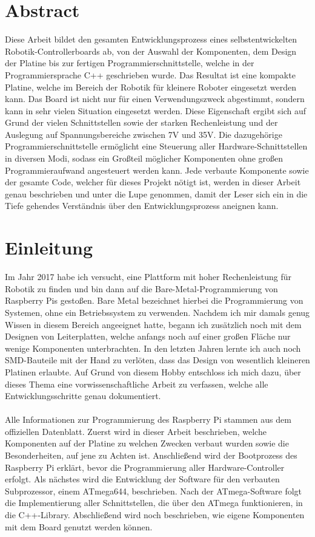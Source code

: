\documentclass[12pt]{article}
\begin{document}
\newpage\section*{Abstract}
Diese Arbeit bildet den gesamten Entwicklungsprozess eines selbstentwickelten Robotik-Controllerboards ab, von der Auswahl der Komponenten, dem Design der Platine bis zur fertigen Programmierschnittstelle, welche in der Programmiersprache C++ geschrieben wurde. Das Resultat ist eine kompakte Platine, welche im Bereich der Robotik für kleinere Roboter eingesetzt werden kann. Das Board ist nicht nur für einen Verwendungszweck abgestimmt, sondern kann in sehr vielen Situation eingesetzt werden. Diese Eigenschaft ergibt sich auf Grund der vielen Schnittstellen sowie der starken Rechenleistung und der Auslegung auf Spannungsbereiche zwischen 7V und 35V. Die dazugehörige Programmierschnittstelle ermöglicht eine Steuerung aller Hardware-Schnittstellen in diversen Modi, sodass ein Großteil möglicher Komponenten ohne großen Programmieraufwand angesteuert werden kann. Jede verbaute Komponente sowie der gesamte Code, welcher für dieses Projekt nötigt ist, werden in dieser Arbeit genau beschrieben und unter die Lupe genommen, damit der Leser sich ein in die Tiefe gehendes Verständnis über den Entwicklungsprozess aneignen kann.
\newpage\tableofcontents
\newpage\section{Einleitung}
Im Jahr 2017 habe ich versucht, eine Plattform mit hoher Rechenleistung für Robotik zu finden und bin dann auf die Bare-Metal-Programmierung von Raspberry Pis gestoßen. Bare Metal bezeichnet hierbei die Programmierung von Systemen, ohne ein Betriebssystem zu verwenden. Nachdem ich mir damals genug Wissen in diesem Bereich angeeignet hatte, begann ich zusätzlich noch mit dem Designen von Leiterplatten, welche anfangs noch auf einer großen Fläche nur wenige Komponenten unterbrachten. In den letzten Jahren lernte ich auch noch SMD-Bauteile mit der Hand zu verlöten, dass das Design von wesentlich kleineren Platinen erlaubte. Auf Grund von diesem Hobby entschloss ich mich dazu, über dieses Thema eine vorwissenschaftliche Arbeit zu verfassen, welche alle Entwicklungsschritte genau dokumentiert.\\\\
Alle Informationen zur Programmierung des Raspberry Pi stammen aus dem offiziellen Datenblatt. Zuerst wird in dieser Arbeit beschrieben, welche Komponenten auf der Platine zu welchen Zwecken verbaut wurden sowie die Besonderheiten, auf jene zu Achten ist. Anschließend wird der Bootprozess des Raspberry Pi erklärt, bevor die Programmierung aller Hardware-Controller erfolgt. Als nächstes wird die Entwicklung der Software für den verbauten Subprozessor, einem ATmega644, beschrieben. Nach der ATmega-Software folgt die Implementierung aller Schnittstellen, die über den ATmega funktionieren, in die C++-Library. Abschließend wird noch beschrieben, wie eigene Komponenten mit dem Board genutzt werden können.
\end{document}
